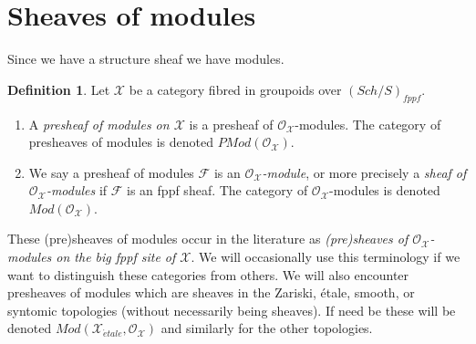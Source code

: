 \documentclass{stacks-project}
\theoremstyle{plain}
\theoremstyle{definition}
\newtheorem{definition}[subsection]{Definition}
\theoremstyle{remark}
\numberwithin{equation}{subsection}
\def\Sch{\mathit{Sch}}
\def\etale{{\acute{e}tale}}
\begin{document}
\section{Sheaves of modules}
\label{section-modules}

\noindent
Since we have a structure sheaf we have modules.

\begin{definition}
\label{definition-modules}
Let $\mathcal{X}$ be a category fibred in groupoids over
$(\Sch/S)_{fppf}$.
\begin{enumerate}
\item A {\it presheaf of modules on $\mathcal{X}$} is a
presheaf of $\mathcal{O}_\mathcal{X}$-modules. The category of
presheaves of modules is denoted $\textit{PMod}(\mathcal{O}_\mathcal{X})$.
\item We say a presheaf of modules $\mathcal{F}$ is an
{\it $\mathcal{O}_\mathcal{X}$-module}, or more precisely a
{\it sheaf of $\mathcal{O}_\mathcal{X}$-modules} if $\mathcal{F}$
is an fppf sheaf. The category of $\mathcal{O}_\mathcal{X}$-modules
is denoted $\textit{Mod}(\mathcal{O}_\mathcal{X})$.
\end{enumerate}
\end{definition}

\noindent
These (pre)sheaves of modules occur in the literature as {\it (pre)sheaves
of $\mathcal{O}_\mathcal{X}$-modules on the big fppf site of $\mathcal{X}$}.
We will occasionally use this terminology if we want to distinguish these
categories from others. We will also encounter presheaves of modules which
are sheaves in the Zariski, \'etale, smooth, or syntomic topologies
(without necessarily being sheaves). If need be these will be denoted
$\textit{Mod}(\mathcal{X}_\etale, \mathcal{O}_\mathcal{X})$
and similarly for the other topologies.
\end{document}
